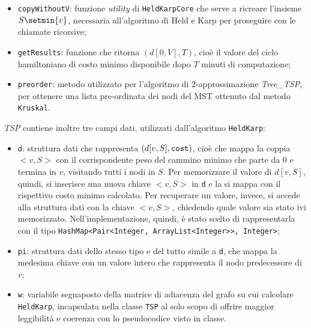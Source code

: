 \begin{itemize}
	\begin{itemize}
		\item \texttt{copyWithoutV}: funzione \textit{utility} di \texttt{HeldKarpCore} che serve a ricreare l'insieme $S\setmin \{v\}$, necessaria all'algoritmo di Held e Karp per proseguire con le chiamate ricorsive;
		\item \texttt{getResults}: funzione che ritorna $\left(d[0,V], T\right)$, cioè il valore del ciclo hamiltoniano di costo minimo disponibile dopo $T$ minuti di computazione;
		\item \texttt{preorder}: metodo utilizzato per l'algoritmo di 2-approssimazione \textit{Tree\_TSP}, per ottenere una lista pre-ordinata dei nodi del MST ottenuto dal metodo \texttt{Kruskal}.
	\end{itemize}
	\textit{TSP} contiene inoltre tre campi dati, utilizzati dall'algoritmo \texttt{HeldKarp}:
	\begin{itemize}
		\item \texttt{d}: struttura dati che rappresenta $\left(d[v, S],\text{\texttt{cost}}\right)$, cioè che mappa la coppia $<\!\!v, S\!\!>$ con il corrispondente peso del cammino minimo che parte da 0 e termina in $v$, visitando tutti i nodi in $S$. Per memorizzare il valore di $d[v,S]$, quindi, si inserisce una nuova chiave $<\!\!v, S\!\!>$ in \texttt{d} e la si mappa con il rispettivo costo minimo calcolato. Per recuperare un valore, invece, si accede alla struttura dati con la chiave $<\!\!v, S\!\!>$, chiedendo quale valore sia stato ivi memorizzato. Nell'implementazione, quindi, è stato scelto di rappresentarla con il tipo \texttt{HashMap<Pair<Integer, ArrayList<Integer>>, Integer>};
		\item \texttt{pi}: struttura dati dello stesso tipo e del tutto simile a \texttt{d}, che mappa la medesima chiave con un valore intero che rappresenta il nodo predecessore di $v$;
		\item \texttt{w}: variabile segnaposto della matrice di adiacenza del grafo su cui calcolare \texttt{HeldKarp}, incapsulata nella classe \texttt{TSP} al solo scopo di offrire maggior leggibilità e coerenza con lo pseudocodice visto in classe.
	\end{itemize}
\end{itemize} 

